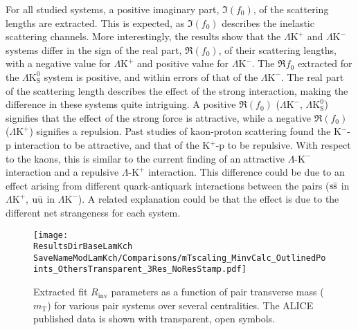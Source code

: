 \documentclass[ALICE,manyauthors]{cernphprep}
\newcommand{\ResultsDirBaseLamKch}{/home/jesse/Analysis/FemtoAnalysis/Results/Results_cLamcKch_20180505/}
\newcommand{\MomRes}{_MomResCrctn}%
\newcommand{\NonFlatBgdLamKch}{_NonFlatBgdCrctnLamK0LinearLamKchPolynomial}
\newcommand{\ResNum}{_3Res}
\newcommand{\PrimMaxDecay}{_PrimMaxDecay10fm}
\newcommand{\ResMethod}{_UsingXiDataAndCoulombOnly}
\newcommand{\ParamFixAndShareLamKch}{_ShareLam_Dualie_ShareLam_ShareRadii}
\newcommand{\SaveNameModLamKch}{\MomRes\NonFlatBgdLamKch\ResNum\PrimMaxDecay\ResMethod\ParamFixAndShareLamKch}
\newcommand{\mt}{$m_{\mathrm{T}}$\xspace}
\newcommand{\Lam}{$\Lambda$\xspace}
\newcommand{\KchP}{$\mathrm{K^{+}}$\xspace}
\newcommand{\KchM}{$\mathrm{K^{-}}$\xspace}
\newcommand{\LamKchP}{$\Lambda\mathrm{K^{+}}$\xspace}
\newcommand{\LamKchM}{$\Lambda\mathrm{K^{-}}$\xspace}
\newcommand{\LamKs}{$\Lambda\mathrm{K^{0}_{S}}$\xspace}
\begin{document}
For all studied systems, a positive imaginary part, $\Im(f_{0})$, of the scattering lengths are extracted. 
This is expected, as $\Im(f_{0})$ describes the inelastic scattering channels.
More interestingly, the results show that the \LamKchP and \LamKchM systems differ in the sign of the real part, $\Re(f_{0})$, of their scattering lengths, with a negative value for \LamKchP and positive value for \LamKchM.
The $\Re f_{0}$ extracted for the \LamKs system is positive, and within errors of that of the \LamKchM. 
The real part of the scattering length describes the effect of the strong interaction, making the difference in these systems quite intriguing.
A positive $\Re(f_{0})$ (\LamKchM, \LamKs) signifies that the effect of the strong force is attractive, while a negative $\Re(f_{0})$ (\LamKchP) signifies a repulsion.
Past studies of kaon-proton scattering found the K$^{-}$-p interaction to be attractive, and that of the K$^{+}$-p to be repulsive.
With respect to the kaons, this is similar to the current finding of an attractive \Lam-\KchM interaction and a repulsive \Lam-\KchP interaction.
This difference could be due to an effect arising from different quark-antiquark interactions between the pairs ($\rm s\bar{s}$ in \LamKchP, $\rm u\bar{u}$ in \LamKchM).
A related explanation could be that the effect is due to the different net strangeness for each system.


\begin{figure}[h]
  \centering
  \texttt{[image: \\ResultsDirBaseLamKch\\SaveNameModLamKch/Comparisons/mTscaling\_MinvCalc\_OutlinedPoints\_OthersTransparent\_3Res\_NoResStamp.pdf]}
  \caption[\mt Scaling of Radii: 3 Residuals in Fit]
  {
  Extracted fit $R_{\mathrm{inv}}$ parameters as a function of pair transverse mass (\mt) for various pair systems over several centralities. The ALICE published data \cite{Adam:2015vja} is shown with transparent, open symbols.
  }
  \label{fig:mTScalingOfRadii_3Res}
\end{figure}
\end{document}
